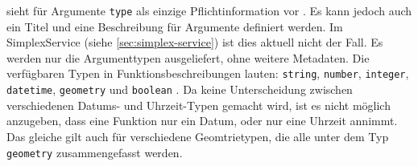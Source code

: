 

 sieht für Argumente \texttt{type} als einzige Pflichtinformation vor . Es kann jedoch auch ein Titel und eine Beschreibung für Argumente definiert werden.  Im SimplexService (siehe \ref{sec:simplex-service}) ist dies aktuell nicht der Fall. Es werden nur die Argumenttypen ausgeliefert, ohne weitere Metadaten. Die verfügbaren Typen in Funktionsbeschreibungen lauten: \texttt{string}, \texttt{number}, \texttt{integer}, \texttt{datetime}, \texttt{geometry} und \texttt{boolean} . Da keine Unterscheidung zwischen verschiedenen Datums- und Uhrzeit-Typen gemacht wird, ist es nicht möglich anzugeben, dass eine Funktion nur ein Datum, oder nur eine Uhrzeit annimmt. Das gleiche gilt auch für verschiedene Geomtrietypen, die alle unter dem Typ \texttt{geometry} zusammengefasst werden.
